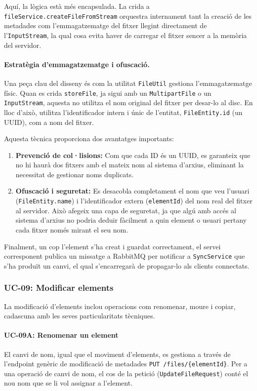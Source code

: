 Aquí, la lògica està més encapsulada. La crida a \texttt{fileService.createFileFromStream} orquestra internament tant la creació de les metadades com l'emmagatzematge del fitxer llegint directament de l'\texttt{InputStream}, la qual cosa evita haver de carregar el fitxer sencer a la memòria del servidor.

\paragraph{Estratègia d'emmagatzematge i ofuscació.} Una peça clau del disseny és com la utilitat \texttt{FileUtil} gestiona l'emmagatzematge físic. Quan es crida \texttt{storeFile}, ja sigui amb un \texttt{MultipartFile} o un \texttt{InputStream}, aquesta no utilitza el nom original del fitxer per desar-lo al disc. En lloc d'això, utilitza l'identificador intern i únic de l'entitat, \texttt{FileEntity.id} (un UUID), com a nom del fitxer.

Aquesta tècnica proporciona dos avantatges importants:
\begin{enumerate}
    \item \textbf{Prevenció de col·lisions:} Com que cada ID és un UUID, es garanteix que no hi haurà dos fitxers amb el mateix nom al sistema d'arxius, eliminant la necessitat de gestionar noms duplicats.
    \item \textbf{Ofuscació i seguretat:} Es desacobla completament el nom que veu l'usuari (\texttt{FileEntity.name}) i l'identificador extern (\texttt{elementId}) del nom real del fitxer al servidor. Això afegeix una capa de seguretat, ja que algú amb accés al sistema d'arxius no podria deduir fàcilment a quin element o usuari pertany cada fitxer només mirant el seu nom.
\end{enumerate}

Finalment, un cop l'element s'ha creat i guardat correctament, el servei corresponent publica un missatge a RabbitMQ per notificar a \texttt{SyncService} que s'ha produït un canvi, el qual s'encarregarà de propagar-lo als clients connectats.

\subsubsection{UC-09: Modificar elements}

La modificació d'elements inclou operacions com renomenar, moure i copiar, cadascuna amb les seves particularitats tècniques.

\paragraph{UC-09A: Renomenar un element} El canvi de nom, igual que el moviment d'elements, es gestiona a través de l'endpoint genèric de modificació de metadades \texttt{PUT /files/\{elementId\}}. Per a una operació de canvi de nom, el cos de la petició (\texttt{UpdateFileRequest}) conté el nou nom que se li vol assignar a l'element.

